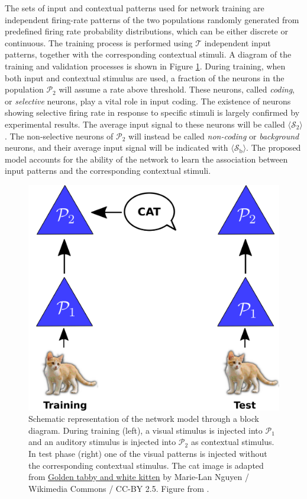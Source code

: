 \documentclass[a4paper, 12pt, twoside, openright]{book}
\newcommand{\popI}{\mathcal{P}_1}
\newcommand{\popII}{\mathcal{P}_2}
\newcommand{\T}{\mathcal{T}}
\newcommand{\SII}{\mathcal{S}_\text{2}}
\newcommand{\Sb}{\mathcal{S}_\text{b}}
\begin{document}
The sets of input and contextual patterns used for network training are independent firing-rate patterns of the two populations randomly generated from predefined firing rate probability distributions, which can be either discrete or continuous. The training process is performed using $\T$ independent input patterns, together with the corresponding contextual stimuli. A diagram of the training and validation processes is shown in Figure \ref{fig:net_scheme}. During training, when both input and contextual stimulus are used, a fraction of the neurons in the population $\popII$ will assume a rate above threshold.
These neurons, called {\it coding}, or {\it selective} neurons, play a vital role in input coding. The existence of neurons showing selective firing rate in response to specific stimuli is largely confirmed by experimental results. The average input signal to these neurons will be called $\langle \SII \rangle$. The non-selective neurons of $\popII$ will instead be called {\it non-coding} or {\it background} neurons, and their average input signal will be indicated with $\langle \Sb \rangle$. The proposed model accounts for the ability of the network to learn the association between input patterns and the corresponding contextual stimuli.


\begin{figure}[H]
\centering
\includegraphics[scale=0.85]{figures/str_pl.png}
\caption{Schematic representation of the network model through a block diagram. During training (left), a visual stimulus is injected into $\popI$ and an auditory stimulus is injected into $\popII$ as contextual stimulus.
In test phase (right) one of the visual patterns is injected without the corresponding contextual stimulus. The cat image is adapted from \href{https://commons.wikimedia.org/wiki/File:Golden\_tabby\_and\_white\_kitten\_n01.jpg}{Golden tabby and white kitten} by Marie-Lan Nguyen / Wikimedia Commons / CC-BY 2.5. Figure from \cite{Tiddia2023}.}
\label{fig:net_scheme}
\end{figure}
\end{document}
